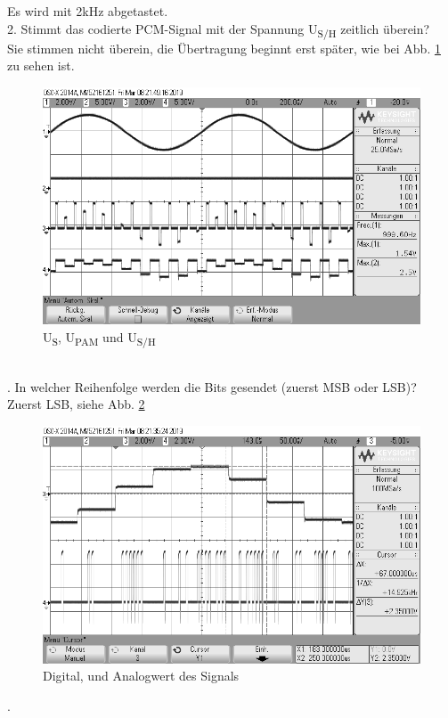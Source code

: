 \documentclass[12pt,a4paper]{scrartcl}
\begin{document}
    Es wird mit 2kHz abgetastet.\\
    2. Stimmt das codierte PCM-Signal mit der Spannung U\textsubscript{S/H} zeitlich überein?\\
    Sie stimmen nicht überein, die Übertragung beginnt erst später, wie bei Abb. \ref{fig:scope_28} zu sehen ist.
    \begin{figure}[htbp]
    \begin{minipage}{1\textwidth}
         \centering
         \includegraphics[width=1\textwidth]{scope_28}
         \caption{U\textsubscript{S}, U\textsubscript{PAM} und U\textsubscript{S/H}}
   
          \label{fig:scope_28}
    \end{minipage}
    \end{figure}\\
    . In welcher Reihenfolge werden die Bits gesendet (zuerst MSB oder LSB)?\\
    Zuerst LSB, siehe Abb. \ref{fig:scope_27}
     \begin{figure}[htbp]
    \begin{minipage}{1\textwidth}
         \centering
         \includegraphics[width=1\textwidth]{scope_27}
         \caption{Digital, und Analogwert des Signals}
   
          \label{fig:scope_27}
    \end{minipage}
    \end{figure}
    \newpage
    .
    
\end{document}
